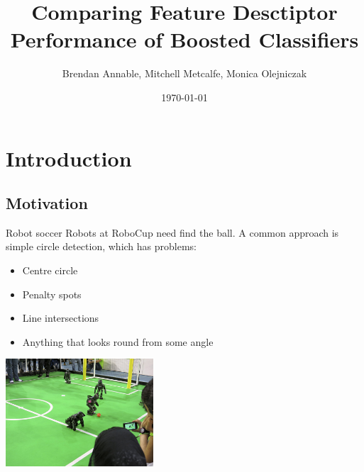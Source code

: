 \documentclass{beamer}
\title{Comparing Feature Desctiptor Performance of Boosted Classifiers }
\author{Brendan Annable, Mitchell Metcalfe, Monica Olejniczak}
\institute{The University of Newcastle, Australia}
\date{\today}
\begin{document}
	\maketitle



\section{Introduction}

	\subsection{Motivation}

	\begin{frame}{Robot soccer}
		Robots at RoboCup \citep{KitanoAKNO97} need find the ball. A common approach is simple circle detection, which has problems: \par
		\begin{itemize}
			\item Centre circle
	        \item Penalty spots
	        \item Line intersections
	        \item Anything that looks round from some angle
		\end{itemize}
		\begin{center}
			\includegraphics[height=4cm]{field2}
		\end{center}
	\end{frame}

\end{document}
